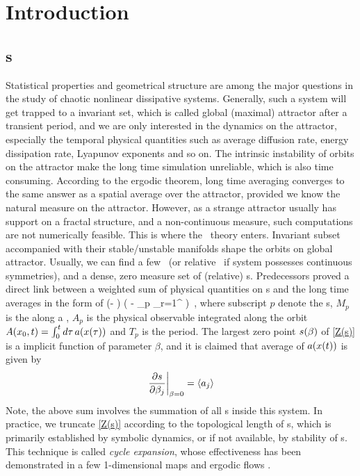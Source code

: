 
\section{Introduction}
\label{sec:Intro}

\subsection{\CycForm s}
Statistical properties and geometrical structure are among the major
questions in the study of chaotic nonlinear dissipative systems.
Generally,
such a system will get trapped to a invariant set,
which is called global
(maximal) attractor after a transient period, and we are only interested
in the dynamics on the attractor, especially the temporal
physical quantities such as average diffusion rate, energy dissipation rate,
Lyapunov exponents and so on. The intrinsic instability of
orbits on the attractor make the long time simulation unreliable, which is
also time consuming. According to the ergodic theorem, %
long time averaging converges to the same answer as a spatial average over the attractor, provided
we know the natural measure on the attractor. However, as a strange attractor usually has
support on a fractal structure, and a non-continuous measure, such computations
are not numerically feasible. This is where the \po\ theory enters.
Invariant subset accompanied with their stable/unstable manifolds shape
the orbits on global attractor. Usually, we can find a few \eqva\ (or relative
\eqva\ if system possesses continuous symmetries), and a dense, zero measure set of
(relative) \po s. Predecessors proved a direct link between
a weighted sum of physical quantities on \po s and the long time averages
in the form of \emph{\Fd}
\beq
    \det(\eigenvL - \Aop)   \exp \left(
        - {
    \sum_{p} \sum_{r=1}^\infty {}
             {}
            }\right)
    \,,
    \label{Z(s)}
\eeq
where subscript $p$ denote the \po s, $M_p$ is the {\monodromyM}
along a \po, $A_p$ is the physical observable integrated along the
orbit $A({x_0},t) =\int_0^t d\tau \, a(x(\tau))$
and $T_p$ is the period. The largest zero point $s(\beta)$ of
\eqref{Z(s)} is a implicit function of parameter $\beta$, and it is claimed that
average of $a(x(t))$ is given by
\begin{equation}
  \label{eq:expect}
  \left.\frac{\partial s}{\partial \beta_j}
  \right|_{\beta=0} = \langle {\ensuremath{a}_j} \rangle
\end{equation}
Note, the above sum involves the summation of all \po s inside this system.
In
practice, we truncate \eqref{Z(s)} according to the topological length of \po s,
which is primarily established by symbolic dynamics, or if not available, by
stability of \po s. This technique is called \emph{cycle expansion},
whose effectiveness has been demonstrated in a few 1-dimensional maps and
ergodic flows .


